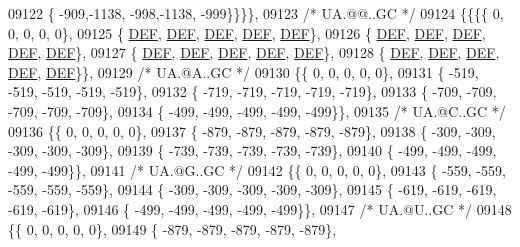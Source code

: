 \begin{DoxyCode}
09122 \{ -909,-1138, -998,-1138, -999\}\}\}\},
09123 \textcolor{comment}{/* UA.@@..GC */}
09124 \{\{\{\{    0,    0,    0,    0,    0\},
09125 \{  \mbox{\hyperlink{1_88_84__epars_8h_a397419fc12b37ed479c8abb9d444d843}{DEF}},  \mbox{\hyperlink{1_88_84__epars_8h_a397419fc12b37ed479c8abb9d444d843}{DEF}},  \mbox{\hyperlink{1_88_84__epars_8h_a397419fc12b37ed479c8abb9d444d843}{DEF}},  \mbox{\hyperlink{1_88_84__epars_8h_a397419fc12b37ed479c8abb9d444d843}{DEF}},  \mbox{\hyperlink{1_88_84__epars_8h_a397419fc12b37ed479c8abb9d444d843}{DEF}}\},
09126 \{  \mbox{\hyperlink{1_88_84__epars_8h_a397419fc12b37ed479c8abb9d444d843}{DEF}},  \mbox{\hyperlink{1_88_84__epars_8h_a397419fc12b37ed479c8abb9d444d843}{DEF}},  \mbox{\hyperlink{1_88_84__epars_8h_a397419fc12b37ed479c8abb9d444d843}{DEF}},  \mbox{\hyperlink{1_88_84__epars_8h_a397419fc12b37ed479c8abb9d444d843}{DEF}},  \mbox{\hyperlink{1_88_84__epars_8h_a397419fc12b37ed479c8abb9d444d843}{DEF}}\},
09127 \{  \mbox{\hyperlink{1_88_84__epars_8h_a397419fc12b37ed479c8abb9d444d843}{DEF}},  \mbox{\hyperlink{1_88_84__epars_8h_a397419fc12b37ed479c8abb9d444d843}{DEF}},  \mbox{\hyperlink{1_88_84__epars_8h_a397419fc12b37ed479c8abb9d444d843}{DEF}},  \mbox{\hyperlink{1_88_84__epars_8h_a397419fc12b37ed479c8abb9d444d843}{DEF}},  \mbox{\hyperlink{1_88_84__epars_8h_a397419fc12b37ed479c8abb9d444d843}{DEF}}\},
09128 \{  \mbox{\hyperlink{1_88_84__epars_8h_a397419fc12b37ed479c8abb9d444d843}{DEF}},  \mbox{\hyperlink{1_88_84__epars_8h_a397419fc12b37ed479c8abb9d444d843}{DEF}},  \mbox{\hyperlink{1_88_84__epars_8h_a397419fc12b37ed479c8abb9d444d843}{DEF}},  \mbox{\hyperlink{1_88_84__epars_8h_a397419fc12b37ed479c8abb9d444d843}{DEF}},  \mbox{\hyperlink{1_88_84__epars_8h_a397419fc12b37ed479c8abb9d444d843}{DEF}}\}\},
09129 \textcolor{comment}{/* UA.@A..GC */}
09130 \{\{    0,    0,    0,    0,    0\},
09131 \{ -519, -519, -519, -519, -519\},
09132 \{ -719, -719, -719, -719, -719\},
09133 \{ -709, -709, -709, -709, -709\},
09134 \{ -499, -499, -499, -499, -499\}\},
09135 \textcolor{comment}{/* UA.@C..GC */}
09136 \{\{    0,    0,    0,    0,    0\},
09137 \{ -879, -879, -879, -879, -879\},
09138 \{ -309, -309, -309, -309, -309\},
09139 \{ -739, -739, -739, -739, -739\},
09140 \{ -499, -499, -499, -499, -499\}\},
09141 \textcolor{comment}{/* UA.@G..GC */}
09142 \{\{    0,    0,    0,    0,    0\},
09143 \{ -559, -559, -559, -559, -559\},
09144 \{ -309, -309, -309, -309, -309\},
09145 \{ -619, -619, -619, -619, -619\},
09146 \{ -499, -499, -499, -499, -499\}\},
09147 \textcolor{comment}{/* UA.@U..GC */}
09148 \{\{    0,    0,    0,    0,    0\},
09149 \{ -879, -879, -879, -879, -879\},

\end{DoxyCode}
